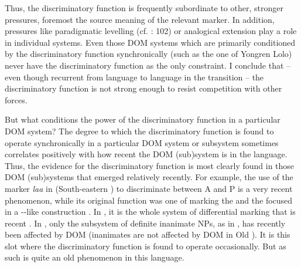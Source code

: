 \documentclass[output=paper]{langsci/langscibook}
\begin{document}
Thus, the discriminatory function is frequently subordinate to other, stronger pressures, foremost the source meaning of the relevant marker. In addition, pressures like paradigmatic levelling (cf. \citealt{Jäger2007}: 102) or analogical extension play a role in individual systems. Even those DOM systems which are primarily conditioned by the discriminatory function synchronically (such as the one of Yongren Lolo) never have the discriminatory function as the only constraint. I conclude that – even though recurrent from language to language in the transition – the discriminatory function is not strong enough to resist competition with other \largerpage forces. 

But what conditions the power of the discriminatory function in a particular DOM system? The degree to which the discriminatory function is found to operate synchronically in a particular DOM system or subsystem sometimes correlates positively with how recent the DOM (sub)system is in the language. Thus, the evidence for the discriminatory function is most clearly found in those DOM (sub)systems that emerged relatively recently. For example, the use of the marker \textit{laa} in  (South-eastern ) to discriminate between A and P is a very recent phenomenon, while its original function was one of marking the  and the focused  in a --like construction \citep{Nikitina2018}. In , it is the whole system of differential marking that is recent \citep{Nikitina2018}. In , only the subsystem of definite inanimate NPs, as in , has recently been affected by DOM (inanimates are not affected by DOM in Old ). It is this slot where the discriminatory function is found to operate occasionally. But  as such is quite an old phenomenon in this language.
\end{document}
